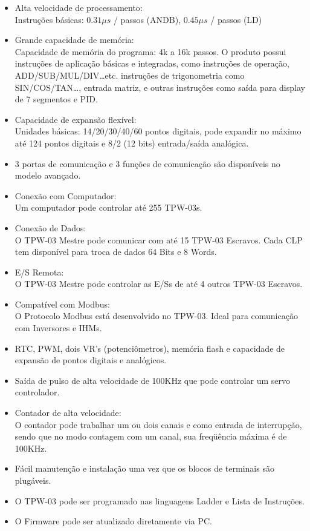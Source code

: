 \begin{itemize}
    \item Alta velocidade de processamento:\\
        Instruções básicas: $0.31\mu s$ / passos (ANDB), $0.45\mu s$ / passos (LD)
    \item Grande capacidade de memória:\\
        Capacidade de memória do programa: 4k a 16k passos. O produto possui instruções de aplicação básicas e integradas, como instruções de operação, ADD/SUB/MUL/DIV…etc. instruções de trigonometria como SIN/COS/TAN…, entrada matriz, e outras instruções como saída para display de 7 segmentos e PID.
    \item Capacidade de expansão flexível:\\
        Unidades básicas: 14/20/30/40/60 pontos digitais, pode expandir no máximo até 124 pontos digitais e 8/2 (12 bits) entrada/saída analógica.
    \item 3 portas de comunicação e 3 funções de comunicação são disponíveis no modelo avançado.
    \item Conexão com Computador:\\
        Um computador pode controlar até 255 TPW-03s.
    \item Conexão de Dados: \\
        O TPW-03 Mestre pode comunicar com até 15 TPW-03 Escravos. Cada CLP tem disponível para troca de dados 64 Bits e 8 Words.
    \item E/S Remota:\\
        O TPW-03 Mestre pode controlar as E/Ss de até 4 outros TPW-03 Escravos.
    \item Compatível com Modbus:\\
        O Protocolo Modbus está desenvolvido no TPW-03. Ideal para comunicação com Inversores e IHMs.
    \item RTC, PWM, dois VR’s (potenciômetros), memória flash e capacidade de expansão de pontos digitais e analógicos.
    \item Saída de pulso de alta velocidade de 100KHz que pode controlar um servo controlador.
    \item Contador de alta velocidade:\\
        O contador pode trabalhar um ou dois canais e como entrada de interrupção, sendo que no modo contagem com um canal, sua freqüência máxima é de 100KHz.
    \item Fácil manutenção e instalação uma vez que os blocos de terminais são plugáveis.
    \item O TPW-03 pode ser programado nas linguagens Ladder e Lista de Instruções.
    \item O Firmware pode ser atualizado diretamente via PC.
\end{itemize}

